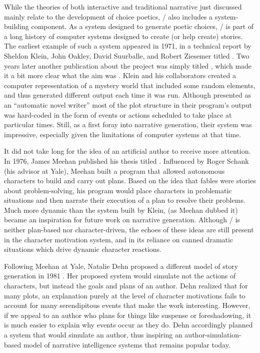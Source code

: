 While the theories of both interactive and traditional narrative just discussed mainly relate to the development of choice poetics, \dunyazad/ also includes a system-building component.
%
As a system designed to generate poetic choices, \dunyazad/ is part of a long history of computer systems designed to create (or help create) stories.
%
The earliest example of such a system appeared in 1971, in a technical report by Sheldon Klein, John Oakley, David Suurballe, and Robert Ziesemer titled  \citep{Klein1971}.
%
Two years later another publication about the project was simply titled , which made it a bit more clear what the aim was \citep{Klein1973}.
%
Klein and his collaborators created a computer representation of a mystery world that included some random elements, and thus generated different output each time it was run.
%
Although presented as an ``automatic novel writer'' most of the plot structure in their program's output was hard-coded in the form of events or actions scheduled to take place at particular times.
%
Still, as a first foray into narrative generation, their system was impressive, especially given the limitations of computer systems at that time.


It did not take long for the idea of an artificial author to receive more attention.
%
In 1976, James Meehan published his thesis titled  \citep{Meehan1976}.
%
Influenced by Roger Schank (his advisor at Yale), Meehan built a program that allowed autonomous characters to build and carry out plans.
%
Based on the idea that fables were stories about problem-solving, his program would place characters in problematic situations and then narrate their execution of a plan to resolve their problems.
%
Much more dynamic than the system built by Klein,  (as Meehan dubbed it) became an inspiration for future work on narrative generation.
%
Although \dunyazad/ is neither plan-based nor character-driven, the echoes of these ideas are still present in the character motivation system, and in its reliance on canned dramatic situations which drive dynamic character reactions.


Following Meehan at Yale, Natalie Dehn proposed a different model of story generation in 1981 \citep{Dehn1981}.
%
Her proposed system  would simulate not the actions of characters, but instead the goals and plans of an author.
%
Dehn realized that for many plots, an explanation purely at the level of character motivations fails to account for many serendipitous events that make the work interesting.
%
However, if we appeal to an author who plans for things like suspense or foreshadowing, it is much easier to explain why events occur as they do.
%
Dehn accordingly planned a system that would simulate an author, thus inspiring an author-simulation-based model of narrative intelligence systems that remains popular today.


